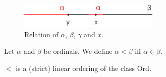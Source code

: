 \documentclass[12pt]{book}
\begin{document}
\begin{figure}[htb!]
	\centering  
	\includegraphics[width=0.6\textwidth ]{resources/part_set/ordinal1.pdf}  
	\caption{Relation of $\alpha$, $\beta$, $\gamma$ and $x$.}
	\label{fig:ordinal1}
\end{figure}

\begin{definition}
	Let $\alpha$ and $\beta$ be ordinals. We define $\alpha<\beta$ iff $\alpha\in\beta$.
\end{definition}
\begin{corollary}
	$<$ is a (strict) linear ordering of the class Ord.                                                                                                                                                                                                                                                                                                                                                                                                                                                                                                                                                                                                                                                                                                                                                                                                                                                                                                                                                                                                                                                                                                                                                                                                                                                                                                                                                                                                                                                                                                                                                                                                                                                                                                                                                                                                                                                                                                                                                                                                                                                                                                                                                                                                                                                                                                                                                                                                                                                                                                                                                
\end{corollary}
\end{document}
